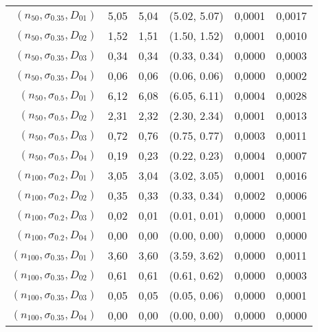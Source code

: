 \documentclass[preprint,12pt]{elsarticle}
\begin{document}
\begin{table}[htbp]
\begin{tabular}{rrrcrr}
 $(n_{50},\sigma_{0.35},D_{01})$ & 5,05  & 5,04  &  (5.02, 5.07) & 0,0001 & 0,0017 \\
 $(n_{50},\sigma_{0.35},D_{02})$ & 1,52  & 1,51  &  (1.50, 1.52) & 0,0001 & 0,0010 \\
 $(n_{50},\sigma_{0.35},D_{03})$ & 0,34  & 0,34  &  (0.33, 0.34) & 0,0000 & 0,0003 \\
 $(n_{50},\sigma_{0.35},D_{04})$ & 0,06  & 0,06  &  (0.06, 0.06) & 0,0000 & 0,0002 \\
 $(n_{50},\sigma_{0.5},D_{01})$ & 6,12  & 6,08  &  (6.05, 6.11) & 0,0004 & 0,0028 \\
 $(n_{50},\sigma_{0.5},D_{02})$ & 2,31  & 2,32  &  (2.30, 2.34) & 0,0001 & 0,0013 \\
 $(n_{50},\sigma_{0.5},D_{03})$  & 0,72  & 0,76  &  (0.75, 0.77) & 0,0003 & 0,0011 \\
 $(n_{50},\sigma_{0.5},D_{04})$  & 0,19  & 0,23  &  (0.22, 0.23) & 0,0004 & 0,0007 \\
 $(n_{100},\sigma_{0.2},D_{01})$& 3,05  & 3,04  &  (3.02, 3.05) & 0,0001 & 0,0016 \\
 $(n_{100},\sigma_{0.2},D_{02})$ & 0,35  & 0,33  &  (0.33, 0.34) & 0,0002 & 0,0006 \\
 $(n_{100},\sigma_{0.2},D_{03})$ & 0,02  & 0,01  &  (0.01, 0.01) & 0,0000 & 0,0001 \\
 $(n_{100},\sigma_{0.2},D_{04})$& 0,00  & 0,00  &  (0.00, 0.00) & 0,0000 & 0,0000 \\
 $(n_{100},\sigma_{0.35},D_{01})$ & 3,60  & 3,60  &  (3.59, 3.62) & 0,0000 & 0,0011 \\
 $(n_{100},\sigma_{0.35},D_{02})$ & 0,61  & 0,61  &  (0.61, 0.62) & 0,0000 & 0,0003 \\
 $(n_{100},\sigma_{0.35},D_{03})$ & 0,05  & 0,05  &  (0.05, 0.06) & 0,0000 & 0,0001 \\
 $(n_{100},\sigma_{0.35},D_{04})$& 0,00  & 0,00  &  (0.00, 0.00) & 0,0000 & 0,0000 \\
    \bottomrule
    \end{tabular}%
  \label{lognormal1}%
\end{table}%
\end{document}

